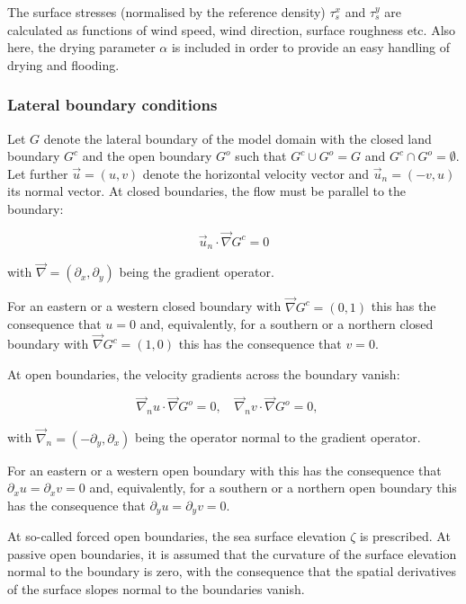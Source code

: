 The surface stresses (normalised by the reference density) $\tau_s^x$
and $\tau_s^y$ are calculated as functions of wind speed, wind direction,
surface roughness etc.
Also here, the drying parameter $\alpha$ is included in order to
provide an easy handling of drying and flooding.

\subsubsection{Lateral boundary conditions}

Let $G$\label{G} denote the lateral boundary of the model domain with the
closed land boundary $G^c$\label{Gc} and the open boundary $G^o$\label{Go} such that
$G^c \cup G^o=G$ and $G^c \cap G^o=\emptyset$.  
Let further $\vec u=(u,v)$\label{vecu} denote the horizontal velocity vector
and $\vec u_n=(-v,u)$\label{vecun} its normal vector.  
At closed boundaries, the flow must be parallel to the boundary:

\begin{equation}
\vec u_n \cdot \vec\nabla G^c = 0 
\end{equation}

with $\vec\nabla=(\partial_x,\partial_y)$ being the gradient operator.

For an eastern or a western closed boundary with
$\vec\nabla G^c=(0,1)$ this has the consequence that
$u=0$ and, equivalently, for a southern
or a northern closed boundary with $\vec\nabla G^c=(1,0)$
this has the consequence that $v=0$.

At open boundaries, the velocity gradients across the boundary vanish:

\begin{equation}
\vec\nabla_n u \cdot \vec\nabla G^o = 0, \quad 
\vec\nabla_n v \cdot \vec\nabla G^o = 0, \quad 
\end{equation}

with $\vec\nabla_n=(-\partial_y,\partial_x)$ being the 
operator normal to the gradient operator.

For an eastern or a western open boundary with
this has the consequence that
$\partial_x u=\partial_x v =0$ and, equivalently, for a southern
or a northern open boundary
this has the consequence that $\partial_y u=\partial_y v =0$.

At so-called forced
open boundaries, the sea surface elevation $\zeta$ is prescribed. 
At passive open boundaries, it is assumed that the curvature of the
surface elevation normal to the boundary is zero, with the consequence that
the spatial derivatives of the surface slopes normal to the boundaries vanish. 

